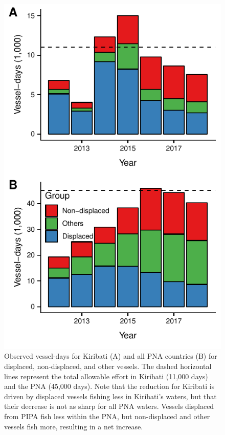 \documentclass[12pt]{article}
\begin{document}
\begin{figure}[htbp]
\centering
\includegraphics{img/all_PS_VDS_PNA_KIR_year.pdf}
\caption{\label{fig:all_PS_VDS_year}Observed vessel-days for Kiribati (A) and all PNA countries (B) for displaced, non-displaced, and other vessels. The dashed horizontal lines represent the total allowable effort in Kiribati (11,000 days) and the PNA (45,000 days). Note that the reduction for Kiribati is driven by displaced vessels fishing less in Kiribati's waters, but that their decrease is not as sharp for all PNA waters. Vessels displaced from PIPA fish less within the PNA, but non-displaced and other vessels fish more, resulting in a net increase.}
\end{figure}
\end{document}
